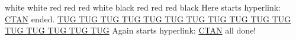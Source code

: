 \documentclass[a4paper,dvipdfmx]{article}
\begin{document}
\Huge
white
\newpage
white
\newpage
\pagecolor{red}
red
\newpage
red
\newpage
red
\newpage
\pagecolor{white}
white
\newpage
black
\newpage
{\color{red}
red
\newpage
red
\newpage
red}
\newpage
black
\newpage
Here starts hyperlink:
\href{https://ctan.org/}{CTAN} ended.
\href{https://tug.org/}%
{TUG TUG TUG TUG TUG TUG TUG TUG TUG TUG TUG TUG TUG TUG TUG TUG}
Again starts hyperlink: \href{https://ctan.org/}{CTAN} all done!
\end{document}
